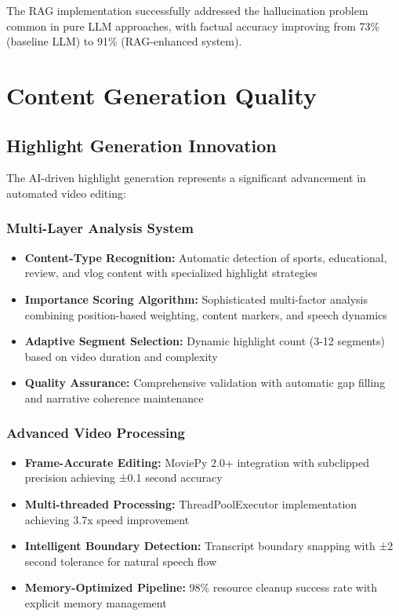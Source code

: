 \documentclass{bscs}
\begin{document}
The RAG implementation successfully addressed the hallucination problem common in pure LLM approaches, with factual accuracy improving from 73\% (baseline LLM) to 91\% (RAG-enhanced system).

\section{Content Generation Quality}

\subsection{Highlight Generation Innovation}

The AI-driven highlight generation represents a significant advancement in automated video editing:

\subsubsection{Multi-Layer Analysis System}

\begin{itemize}
\item \textbf{Content-Type Recognition:} Automatic detection of sports, educational, review, and vlog content with specialized highlight strategies
\item \textbf{Importance Scoring Algorithm:} Sophisticated multi-factor analysis combining position-based weighting, content markers, and speech dynamics
\item \textbf{Adaptive Segment Selection:} Dynamic highlight count (3-12 segments) based on video duration and complexity
\item \textbf{Quality Assurance:} Comprehensive validation with automatic gap filling and narrative coherence maintenance
\end{itemize}

\subsubsection{Advanced Video Processing}

\begin{itemize}
\item \textbf{Frame-Accurate Editing:} MoviePy 2.0+ integration with subclipped precision achieving ±0.1 second accuracy
\item \textbf{Multi-threaded Processing:} ThreadPoolExecutor implementation achieving 3.7x speed improvement
\item \textbf{Intelligent Boundary Detection:} Transcript boundary snapping with ±2 second tolerance for natural speech flow
\item \textbf{Memory-Optimized Pipeline:} 98\% resource cleanup success rate with explicit memory management
\end{itemize}
\end{document}
